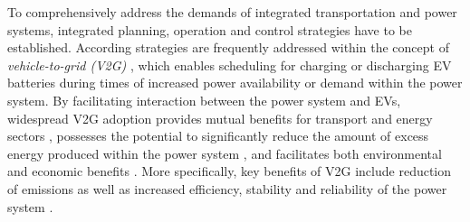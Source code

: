 To comprehensively address the demands of integrated transportation and power systems, integrated planning, operation and control strategies have to be established. According strategies are frequently addressed within the concept of \textit{vehicle-to-grid (V2G)} \cite{lund2008integration}, which enables scheduling for charging or discharging EV batteries during times of increased power availability or demand within the power system. By facilitating interaction between the power system and EVs, widespread V2G adoption provides mutual benefits for transport and energy sectors \cite{lund2006integrated}, possesses the potential to significantly reduce the amount of excess energy produced within the power system \cite{richardson2013electric}, and facilitates both environmental and economic benefits \cite{faria2012sustainability, mwasilu2014electric}. More specifically, key benefits of V2G include reduction of emissions as well as increased efficiency, stability and reliability of the power system \cite{yilmaz2013review}. 





%
